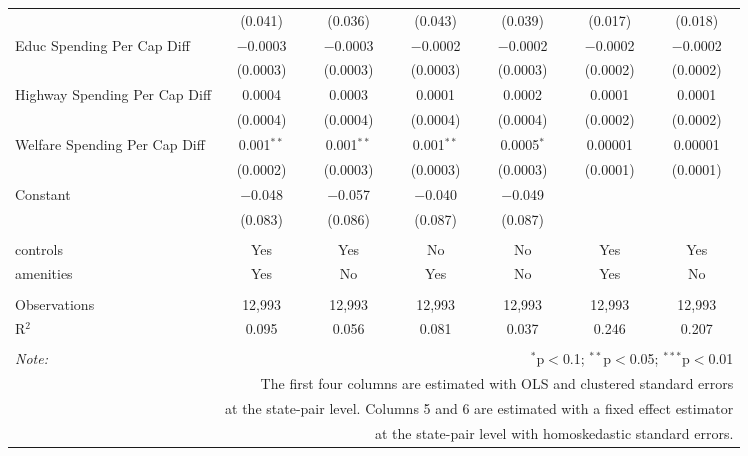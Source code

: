 \begin{table}[!htbp]
\begin{tabular}{@{\extracolsep{5pt}}lcccccc}
  & (0.041) & (0.036) & (0.043) & (0.039) & (0.017) & (0.018) \\ 
  Educ Spending Per Cap Diff & $-$0.0003 & $-$0.0003 & $-$0.0002 & $-$0.0002 & $-$0.0002 & $-$0.0002 \\ 
  & (0.0003) & (0.0003) & (0.0003) & (0.0003) & (0.0002) & (0.0002) \\ 
  Highway Spending Per Cap Diff & 0.0004 & 0.0003 & 0.0001 & 0.0002 & 0.0001 & 0.0001 \\ 
  & (0.0004) & (0.0004) & (0.0004) & (0.0004) & (0.0002) & (0.0002) \\ 
  Welfare Spending Per Cap Diff & 0.001$^{**}$ & 0.001$^{**}$ & 0.001$^{**}$ & 0.0005$^{*}$ & 0.00001 & 0.00001 \\ 
  & (0.0002) & (0.0003) & (0.0003) & (0.0003) & (0.0001) & (0.0001) \\ 
  Constant & $-$0.048 & $-$0.057 & $-$0.040 & $-$0.049 &  &  \\ 
  & (0.083) & (0.086) & (0.087) & (0.087) &  &  \\ 
 \hline \\[-1.8ex] 
controls & Yes & Yes & No & No & Yes & Yes \\ 
amenities & Yes & No & Yes & No & Yes & No \\ 
\hline \\[-1.8ex] 
Observations & 12,993 & 12,993 & 12,993 & 12,993 & 12,993 & 12,993 \\ 
R$^{2}$ & 0.095 & 0.056 & 0.081 & 0.037 & 0.246 & 0.207 \\ 
\hline 
\hline \\[-1.8ex] 
\textit{Note:}  & \multicolumn{6}{r}{$^{*}$p$<$0.1; $^{**}$p$<$0.05; $^{***}$p$<$0.01} \\ 
 & \multicolumn{6}{r}{The first four columns are estimated with OLS and clustered standard errors} \\ 
 & \multicolumn{6}{r}{at the state-pair level. Columns 5 and 6 are estimated with a fixed effect estimator} \\ 
 & \multicolumn{6}{r}{at the state-pair level with homoskedastic standard errors.} \\ 
\end{tabular} 
\end{table} 
